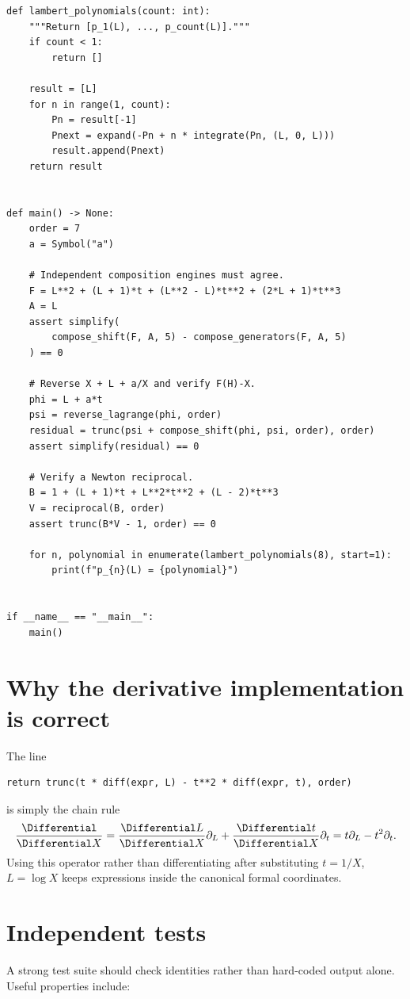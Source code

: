 \documentclass[11pt,oneside,openany]{book}
\begin{document}
\begin{lstlisting}[style=pythonstyle,caption={Reference implementation for the discrete polynomial-logarithmic ring.},label={lst:implementation}]
def lambert_polynomials(count: int):
    """Return [p_1(L), ..., p_count(L)]."""
    if count < 1:
        return []

    result = [L]
    for n in range(1, count):
        Pn = result[-1]
        Pnext = expand(-Pn + n * integrate(Pn, (L, 0, L)))
        result.append(Pnext)
    return result


def main() -> None:
    order = 7
    a = Symbol("a")

    # Independent composition engines must agree.
    F = L**2 + (L + 1)*t + (L**2 - L)*t**2 + (2*L + 1)*t**3
    A = L
    assert simplify(
        compose_shift(F, A, 5) - compose_generators(F, A, 5)
    ) == 0

    # Reverse X + L + a/X and verify F(H)-X.
    phi = L + a*t
    psi = reverse_lagrange(phi, order)
    residual = trunc(psi + compose_shift(phi, psi, order), order)
    assert simplify(residual) == 0

    # Verify a Newton reciprocal.
    B = 1 + (L + 1)*t + L**2*t**2 + (L - 2)*t**3
    V = reciprocal(B, order)
    assert trunc(B*V - 1, order) == 0

    for n, polynomial in enumerate(lambert_polynomials(8), start=1):
        print(f"p_{n}(L) = {polynomial}")


if __name__ == "__main__":
    main()
\end{lstlisting}

\section{Why the derivative implementation is correct}
The line
\begin{lstlisting}[style=pythonstyle,numbers=none]
return trunc(t * diff(expr, L) - t**2 * diff(expr, t), order)
\end{lstlisting}
is simply the chain rule
\[
 \frac{\Differential}{\Differential X}
 =\frac{\Differential L}{\Differential X}\partial_L
  +\frac{\Differential t}{\Differential X}\partial_t
 =t\partial_L-t^2\partial_t.
\]
Using this operator rather than differentiating after substituting
\(t=1/X\), \(L=\log X\) keeps expressions inside the canonical formal
coordinates.

\section{Independent tests}
A strong test suite should check identities rather than hard-coded output alone.
Useful properties include:
\end{document}
